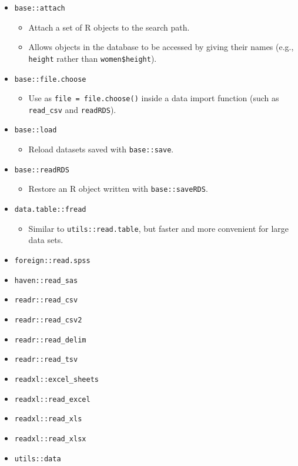 \documentclass[
]{book}
\providecommand{\tightlist}{%
  \setlength{\itemsep}{0pt}\setlength{\parskip}{0pt}}
\begin{document}
\begin{itemize}
\tightlist
\item
  \texttt{base::attach}

  \begin{itemize}
  \tightlist
  \item
    Attach a set of R objects to the search path.
  \item
    Allows objects in the database to be accessed by giving their names (e.g., \texttt{height} rather than \texttt{women\$height}).
  \end{itemize}
\item
  \texttt{base::file.choose}

  \begin{itemize}
  \tightlist
  \item
    Use as \texttt{file\ =\ file.choose()} inside a data import function (such as \texttt{read\_csv} and \texttt{readRDS}).
  \end{itemize}
\item
  \texttt{base::load}

  \begin{itemize}
  \tightlist
  \item
    Reload datasets saved with \texttt{base::save}.
  \end{itemize}
\item
  \texttt{base::readRDS}

  \begin{itemize}
  \tightlist
  \item
    Restore an R object written with \texttt{base::saveRDS}.
  \end{itemize}
\item
  \texttt{data.table::fread}

  \begin{itemize}
  \tightlist
  \item
    Similar to \texttt{utils::read.table}, but faster and more convenient for large data sets.
  \end{itemize}
\item
  \texttt{foreign::read.spss}
\item
  \texttt{haven::read\_sas}
\item
  \texttt{readr::read\_csv}
\item
  \texttt{readr::read\_csv2}
\item
  \texttt{readr::read\_delim}
\item
  \texttt{readr::read\_tsv}
\item
  \texttt{readxl::excel\_sheets}
\item
  \texttt{readxl::read\_excel}
\item
  \texttt{readxl::read\_xls}
\item
  \texttt{readxl::read\_xlsx}
\item
  \texttt{utils::data}


\end{itemize}
\end{document}
